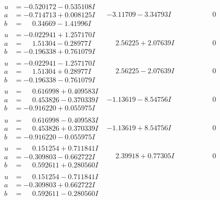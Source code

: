 \documentclass[1p]{elsarticle_modified}
\theoremstyle{definition}
\begin{document}
$$\begin{array}{c|c|c}
\begin{aligned}
u &= -0.520172 - 0.535108 I \\
a &= -0.714713 + 0.008125 I \\
b &= \phantom{-}0.34669 - 1.41996 I\end{aligned}
 & -3.11709 - 3.34793 I & \phantom{-0.000000 } 0 \\ \hline\begin{aligned}
u &= -0.022941 + 1.257170 I \\
a &= \phantom{-}1.51304 - 0.28977 I \\
b &= -0.196338 + 0.761079 I\end{aligned}
 & \phantom{-}2.56225 + 2.07639 I & \phantom{-0.000000 } 0 \\ \hline\begin{aligned}
u &= -0.022941 - 1.257170 I \\
a &= \phantom{-}1.51304 + 0.28977 I \\
b &= -0.196338 - 0.761079 I\end{aligned}
 & \phantom{-}2.56225 - 2.07639 I & \phantom{-0.000000 } 0 \\ \hline\begin{aligned}
u &= \phantom{-}0.616998 + 0.409583 I \\
a &= \phantom{-}0.453826 - 0.370339 I \\
b &= -0.916220 + 0.055975 I\end{aligned}
 & -1.13619 - 8.54756 I & \phantom{-0.000000 } 0 \\ \hline\begin{aligned}
u &= \phantom{-}0.616998 - 0.409583 I \\
a &= \phantom{-}0.453826 + 0.370339 I \\
b &= -0.916220 - 0.055975 I\end{aligned}
 & -1.13619 + 8.54756 I & \phantom{-0.000000 } 0 \\ \hline\begin{aligned}
u &= \phantom{-}0.151254 + 0.711841 I \\
a &= -0.309803 - 0.662722 I \\
b &= \phantom{-}0.592611 + 0.280560 I\end{aligned}
 & \phantom{-}2.39918 + 0.77305 I & \phantom{-0.000000 } 0 \\ \hline\begin{aligned}
u &= \phantom{-}0.151254 - 0.711841 I \\
a &= -0.309803 + 0.662722 I \\
b &= \phantom{-}0.592611 - 0.280560 I\end{aligned}

\end{array}$$
\end{document}

